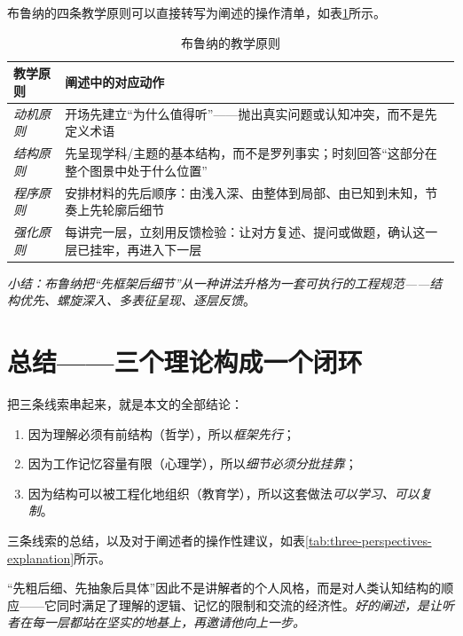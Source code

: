 布鲁纳的四条教学原则可以直接转写为阐述的操作清单，如表\ref{tab:teaching-principle}所示。
\begin{table}[htbp]
    \centering
    \caption{布鲁纳的教学原则}
    \label{tab:teaching-principle}
    \begin{tabularx}{\textwidth}{l >{\raggedright\arraybackslash}X}
        \toprule
        \textbf{教学原则} & \textbf{阐述中的对应动作} \\
        \midrule
        \textit{动机原则} & 开场先建立“为什么值得听”——抛出真实问题或认知冲突，而不是先定义术语 \\
        \textit{结构原则} & 先呈现学科/主题的基本结构，而不是罗列事实；时刻回答“这部分在整个图景中处于什么位置” \\
        \textit{程序原则} & 安排材料的先后顺序：由浅入深、由整体到局部、由已知到未知，节奏上先轮廓后细节 \\
        \textit{强化原则} & 每讲完一层，立刻用反馈检验：让对方复述、提问或做题，确认这一层已挂牢，再进入下一层 \\
        \bottomrule
    \end{tabularx}
\end{table}

\nid\textit{小结：布鲁纳把“先框架后细节”从一种讲法升格为一套可执行的工程规范——结构优先、螺旋深入、多表征呈现、逐层反馈}。

\section{总结——三个理论构成一个闭环}

把三条线索串起来，就是本文的全部结论：
\begin{enumerate}[label=\arabic*.]
    \item 因为理解必须有前结构（哲学），所以\textit{框架先行}；
    \item 因为工作记忆容量有限（心理学），所以\textit{细节必须分批挂靠}；
    \item 因为结构可以被工程化地组织（教育学），所以这套做法\textit{可以学习、可以复制}。
\end{enumerate}
\nid 三条线索的总结，以及对于阐述者的操作性建议，如表\ref{tab:three-perspectives-explanation}所示。

“先粗后细、先抽象后具体”因此不是讲解者的个人风格，而是对人类认知结构的顺应——它同时满足了理解的逻辑、记忆的限制和交流的经济性。\textit{好的阐述，是让听者在每一层都站在坚实的地基上，再邀请他向上一步。}

